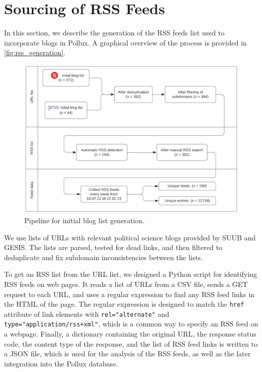 \documentclass{article}
\begin{document}
\section{Sourcing of RSS Feeds}\label{sec:sourcing}
In this section, we describe the generation of the RSS feeds list used to incorporate blogs in Pollux. A graphical overview of the process is provided in \autoref{fig:rss_generation}.

\begin{figure}[htb]
    \centering
    \includegraphics[width=.7\textwidth]{figures/generation_of_initial_list.png}
    \caption{Pipeline for initial blog list generation.}
    \label{fig:rss_generation}
\end{figure}

We use lists of URLs with relevant political science blogs provided by SUUB and GESIS. The lists are parsed, tested for dead links, and then filtered to deduplicate and fix subdomain inconsistencies between the lists.

To get an RSS list from the URL list, we designed a Python script for identifying RSS feeds on web pages. It reads a list of URLs from a CSV file, sends a GET request to each URL, and uses a regular expression to find any RSS feed links in the HTML of the page. The regular expression is designed to match the \texttt{href} attribute of link elements with \texttt{rel="alternate"} and \texttt{type="application/rss+xml"}, which is a common way to specify an RSS feed on a webpage. Finally, a dictionary containing the original URL, the response status code, the content type of the response, and the list of RSS feed links is written to a JSON file, which is used for the analysis of the RSS feeds, as well as the later integration into the Pollux database.
\end{document}
